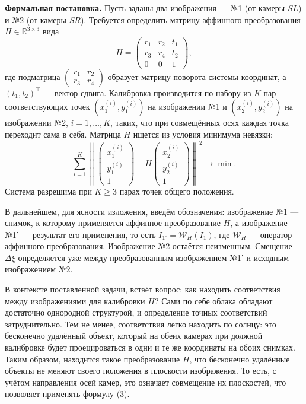 \documentclass[11pt]{article} %
\begin{document}
\textbf{Формальная постановка.} Пусть заданы два изображения --- №1 (от камеры $SL$) и №2 (от камеры $SR$). Требуется определить матрицу аффинного преобразования $H \in \mathbb{R}^{3 \times 3}$ вида
\[
H = \begin{pmatrix} r_1 & r_2 & t_1 \\ r_3 & r_4 & t_2 \\ 0 & 0 & 1 \end{pmatrix},
\]
где подматрица $\begin{pmatrix} r_1 & r_2 \\ r_3 & r_4 \end{pmatrix}$ образует матрицу поворота системы координат, а $(t_1, t_2)^\top$ --- вектор сдвига. Калибровка производится по набору из $K$ пар соответствующих точек $(x^{(i)}_1, y^{(i)}_1)$ на изображении №1 и $(x^{(i)}_2, y^{(i)}_2)$ на изображении №2, $i = 1, \dots, K$, таких, что при совмещённых осях каждая точка переходит сама в себя. Матрица $H$ ищется из условия минимума невязки:
\[
\sum_{i=1}^{K} \left\| \begin{pmatrix} x^{(i)}_1 \\ y^{(i)}_1 \\ 1 \end{pmatrix} - H \begin{pmatrix} x^{(i)}_2 \\ y^{(i)}_2 \\ 1 \end{pmatrix} \right\|^2 \to \min.
\]
Система разрешима при $K \ge 3$ парах точек общего положения.

В дальнейшем, для ясности изложения, введём обозначения: изображение №1 --- снимок, к которому применяется аффинное преобразование $H$, а изображение №1' --- результат его применения, то есть $I_{1'} = \mathcal{W}_H(I_1)$, где $\mathcal{W}_H$ --- оператор аффинного преобразования. Изображение №2 остаётся неизменным. Смещение $\Delta\xi$ определяется уже между преобразованным изображением №1' и исходным изображением №2.

В контексте поставленной задачи, встаёт вопрос: как находить соответствия между изображениями для калибровки $H$? Сами по себе облака обладают достаточно однородной структурой, и определение точных соответствий затруднительно. Тем не менее, соответствия легко находить по солнцу: это бесконечно удалённый объект, который на обеих камерах при должной калибровке будет проецироваться в одни и те же координаты на обоих снимках. Таким образом, находится такое преобразование $H$, что бесконечно удалённые объекты не меняют своего положения в плоскости изображения. То есть, с учётом направления осей камер, это означает совмещение их плоскостей, что позволяет применять формулу (3).
	
\end{document}
